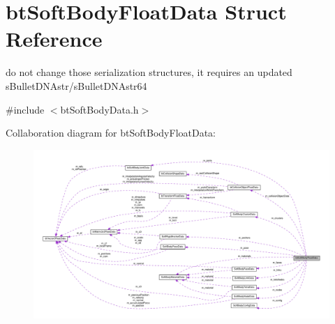 \hypertarget{structbtSoftBodyFloatData}{}\section{bt\+Soft\+Body\+Float\+Data Struct Reference}
\label{structbtSoftBodyFloatData}


do not change those serialization structures, it requires an updated s\+Bullet\+D\+N\+Astr/s\+Bullet\+D\+N\+Astr64  




{\ttfamily \#include $<$bt\+Soft\+Body\+Data.\+h$>$}



Collaboration diagram for bt\+Soft\+Body\+Float\+Data\+:
\nopagebreak
\begin{figure}[H]
\begin{center}
\leavevmode
\includegraphics[width=350pt]{structbtSoftBodyFloatData__coll__graph}
\end{center}
\end{figure}

